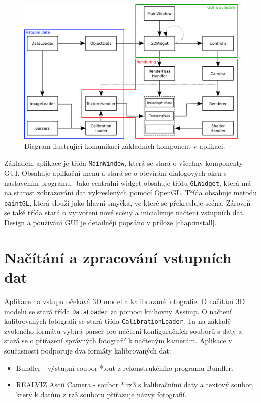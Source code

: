 \documentclass[11pt,twoside,a4paper]{book}
\begin{document}
\begin{figure}[ht]
\begin{center}
\includegraphics[width=\textwidth]{figures/architecture2}
\caption{Diagram ilustrující komunikaci základních komponent v aplikaci.}
\label{fig:architecture}
\end{center}
\end{figure}

Základem aplikace je třída \texttt{MainWindow}, která se stará o všechny komponenty GUI. Obsahuje aplikační menu a stará se o otevírání dialogových oken s nastavením programu. Jako centrální widget obsahuje třídu \texttt{GLWidget}, která má na starost zobrazování dat vykreslených pomocí OpenGL. Třída obsahuje metodu \texttt{paintGL}, která slouží jako hlavní smyčka, ve které se překresluje scéna. Zároveň se také třída  stará o vytvoření nové scény a inicializuje načtení vstupních dat. Design a používání GUI je detailněji popsáno v příloze \ref{chap:install}.


\section{Načítání a zpracování vstupních dat}

Aplikace na vstupu očekává 3D model a kalibrované fotografie. O načítání 3D modelu se stará třída \texttt{DataLoader} za pomoci knihovny Assimp. O načtení kalibrovaných fotografií se stará třída \texttt{CalibrationLoader}. Ta na základě zvoleného formátu vybírá parser pro načtení konfiguračních souborů s daty a stará se o přiřazení správných fotografií k načteným kamerám. Aplikace v současnosti podporuje dva formáty kalibrovaných dat:
\begin{itemize}
\item Bundler - výstupní soubor *.out z rekonstrukčního programu Bundler.
\item REALVIZ Ascii Camera - soubor *.rz3 s kalibračními daty a textový soubor, který k datům z rz3 souboru přiřazuje názvy fotografií.
\end{itemize}
\end{document}
